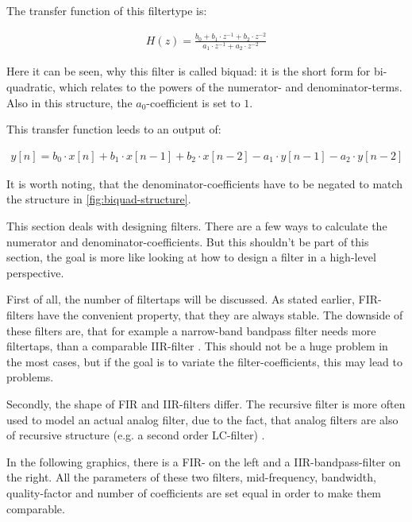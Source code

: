 The transfer function of this filtertype is:

\begin{align}
    H(z) = \frac{b_0 + b_1 \cdot z^{-1} + b_2 \cdot z^{-2}}{a_1 \cdot z^{-1} + a_2 \cdot z^{-2}}
\end{align}

Here it can be seen, why this filter is called \frqq biquad\flqq{}: it is the short form for
\frqq bi-quadratic\flqq{}, which relates to the powers of the numerator- and denominator-terms.
Also in this structure, the $a_0$-coefficient is set to $1$.

This transfer function leeds to an output of:

\begin{align}
    y[n] = b_0 \cdot x[n] + b_1 \cdot x[n-1] + b_2 \cdot x[n-2] - a_1 \cdot y[n-1] - a_2 \cdot y[n-2]
\end{align}

It is worth noting, that the denominator-coefficients have to be negated to match the structure in
\autoref{fig:biquad-structure}.



This section deals with designing filters. There are a few ways to calculate the numerator and
denominator-coefficients. But this shouldn't be part of this section, the goal is more like looking at
how to design a filter in a high-level perspective.

First of all, the number of filtertaps will be discussed. As stated earlier, \ac{FIR}-filters have
the convenient property, that they are always stable. The downside of these filters are,
that for example a narrow-band bandpass filter needs more filtertaps, than a comparable
\ac{IIR}-filter \cite{meyer_signalverarbeitung}. This should not be a huge problem in the most cases,
but if the goal is to variate the filter-coefficients, this may lead to problems.

Secondly, the shape of \ac{FIR} and \ac{IIR}-filters differ. The recursive filter is more often used to
model an actual analog filter, due to the fact, that analog filters are also of recursive structure (e.g.
a second order LC-filter) \cite{meyer_signalverarbeitung}.

In the following graphics, there is a \ac{FIR}- on the left and a \ac{IIR}-bandpass-filter on the right.
All the parameters of these two filters, mid-frequency, bandwidth, quality-factor and number of coefficients
are set equal in order to make them comparable.

